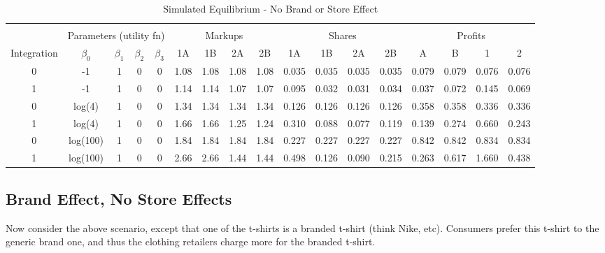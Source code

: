 \documentclass[12pt]{article}%
\begin{document}
\begin{table}[h]
{\begin{tabular}{c|cccc|cccc|cccc|cccc}
    \multicolumn{1}{c}{} &       &       &       & \multicolumn{1}{c}{} &       &       &       & \multicolumn{1}{c}{} &       &       &       & \multicolumn{1}{c}{} &       &       &       &  \\
          & \multicolumn{4}{c|}{Parameters (utility fn)} & \multicolumn{4}{c|}{Markups}  & \multicolumn{4}{c|}{Shares}   & \multicolumn{4}{c}{Profits} \\
    \midrule
    \multicolumn{1}{c|}{Integration} & \multicolumn{1}{c}{$\beta_0$} & \multicolumn{1}{c}{$\beta_1$} & \multicolumn{1}{c}{$\beta_2$} & \multicolumn{1}{c|}{$\beta_3$} & \multicolumn{1}{c}{1A} & \multicolumn{1}{c}{1B} & \multicolumn{1}{c}{2A} & \multicolumn{1}{c|}{2B} & \multicolumn{1}{c}{1A} & \multicolumn{1}{c}{1B} & \multicolumn{1}{c}{2A} & \multicolumn{1}{c|}{2B} & \multicolumn{1}{c}{A} & \multicolumn{1}{c}{B} & \multicolumn{1}{c}{1} & \multicolumn{1}{c}{2} \\
    \midrule
    \midrule
0     & -1    & 1     & 0     & 0     & 1.08  & 1.08  & 1.08  & 1.08  & 0.035 & 0.035 & 0.035 & 0.035 & 0.079 & 0.079 & 0.076 & 0.076 \\
    1     & -1    & 1     & 0     & 0     & 1.14  & 1.14  & 1.07  & 1.07  & 0.095 & 0.032 & 0.031 & 0.034 & 0.037 & 0.072 & 0.145 & 0.069 \\
    0     & log(4) & 1     & 0     & 0     & 1.34  & 1.34  & 1.34  & 1.34  & 0.126 & 0.126 & 0.126 & 0.126 & 0.358 & 0.358 & 0.336 & 0.336 \\
    1     & log(4) & 1     & 0     & 0     & 1.66  & 1.66  & 1.25  & 1.24  & 0.310 & 0.088 & 0.077 & 0.119 & 0.139 & 0.274 & 0.660 & 0.243 \\
    0     & log(100) & 1     & 0     & 0     & 1.84  & 1.84  & 1.84  & 1.84  & 0.227 & 0.227 & 0.227 & 0.227 & 0.842 & 0.842 & 0.834 & 0.834 \\
    1     & log(100) & 1     & 0     & 0     & 2.66  & 2.66  & 1.44  & 1.44  & 0.498 & 0.126 & 0.090 & 0.215 & 0.263 & 0.617 & 1.660 & 0.438 \\

    \end{tabular}%

    }
    \caption{Simulated Equilibrium - No Brand or Store Effect}
  \label{tab:normal}%
\end{table}%

\subsection{Brand Effect, No  Store Effects}
\label{brand effects}
Now consider the above scenario, except that one of the t-shirts is a branded t-shirt (think Nike, etc). Consumers prefer this t-shirt to the generic brand one, and thus the clothing retailers charge more for the branded t-shirt. 
\end{document}
